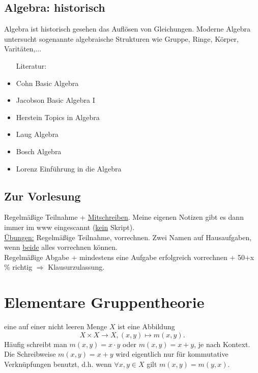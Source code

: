 \subsection*{Algebra: historisch}
Algebra ist historisch gesehen das Auflösen von Gleichungen.
Moderne Algebra untersucht sogenannte algebraische Strukturen wie Gruppe, Ringe, Körper, Varitäten,...

\begin{itemize}
	\item[Literatur:]
	\item Cohn Basic Algebra
	\item Jacobson Basic Algebra I
	\item Herstein Topics in Algebra
	\item Laug Algebra
	\item Bosch Algebra
	\item Lorenz Einführung in die Algebra
\end{itemize}

\subsection*{Zur Vorlesung}
Regelmäßige Teilnahme + \uline{Mitschreiben}.
Meine eigenen Notizen gibt es dann immer im www eingescannt (\uline{kein} Skript).\\
\uline{Übungen:} Regelmäßige Teilnahme, vorrechnen.
Zwei Namen auf Hausaufgaben, wenn \uline{beide} alles vorrechnen können.\\
Regelmäßige Abgabe + mindestens eine Aufgabe erfolgreich vorrechnen + 50+x \% richtig $\Rightarrow$ Klausurzulassung.


\cleardoubleoddemptypage

\setcounter{page}{1}

\section{Elementare Gruppentheorie}
\label{sec:elementare_gruppentheorie}

 eine  auf einer nicht leeren Menge $X$ ist eine Abbildung
\begin{equation*}
X\times X \to X , (x,y) \mapsto m(x,y).
\end{equation*}
Häufig schreibt man $m(x,y)= x\cdot y$ oder $ m(x,y) = x + y$, je nach Kontext. 
Die Schreibweise $m(x,y)=x+y$ wird eigentlich nur für kommutative Verknüpfungen benutzt, d.h. wenn $\forall x,y\in X$ gilt $m(x,y)=m(y,x)$.

